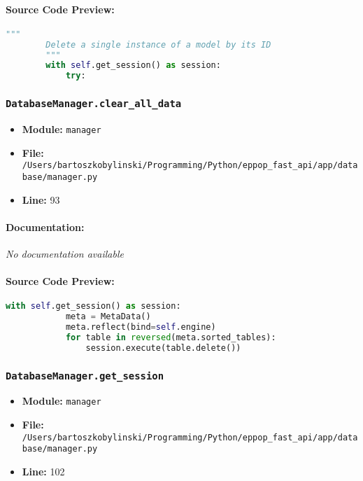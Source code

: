 \documentclass[11pt,a4paper]{article}
\begin{document}
\paragraph{Source Code Preview:}
\begin{lstlisting}[language=Python]
        """
        Delete a single instance of a model by its ID
        """
        with self.get_session() as session:
            try:
\end{lstlisting}

\vspace{1em}
\subsubsection{\texttt{DatabaseManager.clear\_all\_data}}

\begin{itemize}
    \item \textbf{Module:} \texttt{manager}
    \item \textbf{File:} \texttt{/Users/bartoszkobylinski/Programming/Python/eppop\_fast\_api/app/database/manager.py}
    \item \textbf{Line:} 93
\end{itemize}

\paragraph{Documentation:} \textit{No documentation available}

\paragraph{Source Code Preview:}
\begin{lstlisting}[language=Python]
        with self.get_session() as session:
            meta = MetaData()
            meta.reflect(bind=self.engine)
            for table in reversed(meta.sorted_tables):
                session.execute(table.delete())
\end{lstlisting}

\vspace{1em}
\subsubsection{\texttt{DatabaseManager.get\_session}}

\begin{itemize}
    \item \textbf{Module:} \texttt{manager}
    \item \textbf{File:} \texttt{/Users/bartoszkobylinski/Programming/Python/eppop\_fast\_api/app/database/manager.py}
    \item \textbf{Line:} 102
\end{itemize}
\end{document}
